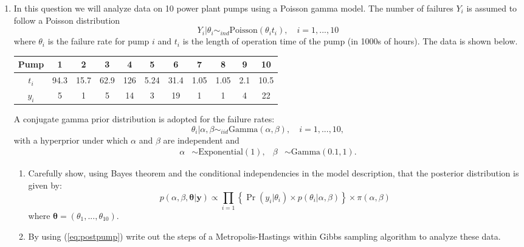 \documentclass{article} %
\begin{document}
\begin{enumerate}
\item
 In this question we will analyze data on 10 power plant pumps using a
 Poisson gamma model. The number of failures $Y_i$ is assumed to
 follow a Poisson distribution
\[ Y_i | \theta_i \sim_{ind} \mbox{Poisson}(\theta_i t_i),\quad i=1,...,10\]
where $\theta_i$ is the failure rate for pump $i$ and $t_i$ is the length of operation time of the pump (in 1000s of hours). The data is shown below.


\begin{table}[h]
\begin{center}
\begin{tabular}{c|cccccccccc}
Pump & 1&2&3&4&5&6&7&8&9&10\\ \hline
$t_i$& 94.3&15.7&62.9&126&5.24&31.4&1.05& 1.05& 2.1&10.5\\ \hline
$y_i$&5&1&5&14&3&19&1&1&4&22
\end{tabular}
\end{center}
\end{table}

A conjugate gamma prior distribution is adopted for the failure rates:
\[ \theta_i |\alpha,\beta \sim_{iid} \mbox{Gamma}(\alpha,\beta),\quad i=1,...,10,
\]
with a hyperprior under which $\alpha$ and $\beta$ are independent and
\begin{align*}
\alpha &\sim \mbox{Exponential}(1), &
\beta &\sim \mbox{Gamma}(0.1,1).
\end{align*}
\begin{enumerate}
\item Carefully show, using Bayes theorem and the conditional independencies in the model description, that the posterior distribution is given by:
\begin{equation}\label{eq:postpump}
p( \alpha,\beta,\boldsymbol{\theta} | \mathbf{y} ) \propto \prod_{i=1} \left\{ \Pr( y_i | \theta_i) \times
p(\theta_i| \alpha,\beta ) \right\} \times \pi(\alpha,\beta)
\end{equation}
where $\boldsymbol{\theta}=(\theta_1,...,\theta_{10})$.
\item By using (\ref{eq:postpump}) write out the steps of a Metropolis-Hastings within Gibbs
  sampling algorithm to analyze these data.


\end{enumerate}
\end{enumerate}
\end{document}
